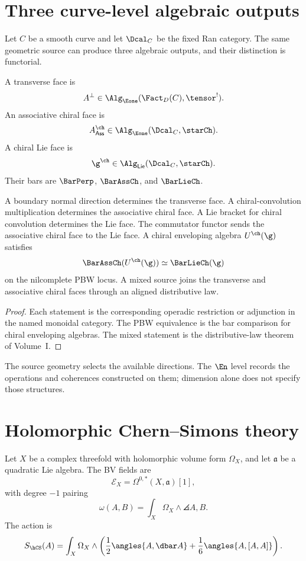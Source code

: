 \chapter{Three curve-level algebraic outputs}
Let $C$ be a smooth curve and let $\Dcal_C$ be the fixed Ran category.  The same geometric source can produce three algebraic outputs, and their distinction is functorial.

\begin{definition}
A transverse face is
\[
 A^\perp\in\Alg_{\Eone}(\Fact_D(C),\tensor^!).
\]
An associative chiral face is
\[
 A^{\ch}_{\mathsf{Ass}}\in\Alg_{\Eone}(\Dcal_C,\starCh).
\]
A chiral Lie face is
\[
 \g^{\ch}\in\Alg_{\mathsf{Lie}}(\Dcal_C,\starCh).
\]
Their bars are $\BarPerp$, $\BarAssCh$, and $\BarLieCh$.
\end{definition}

\begin{theorem}
A boundary normal direction determines the transverse face.  A chiral-convolution multiplication determines the associative chiral face.  A Lie bracket for chiral convolution determines the Lie face.  The commutator functor sends the associative chiral face to the Lie face.  A chiral enveloping algebra $U^{\ch}(\g)$ satisfies
\[
 \BarAssCh(U^{\ch}(\g))\simeq\BarLieCh(\g)
\]
on the nilcomplete PBW locus.  A mixed source joins the transverse and associative chiral faces through an aligned distributive law.
\end{theorem}
\begin{proof}
Each statement is the corresponding operadic restriction or adjunction in the named monoidal category.  The PBW equivalence is the bar comparison for chiral enveloping algebras.  The mixed statement is the distributive-law theorem of Volume~I.
\end{proof}

The source geometry selects the available directions.  The $\En$ level records the operations and coherences constructed on them; dimension alone does not specify those structures.

\chapter{Holomorphic Chern--Simons theory}
Let $X$ be a complex threefold with holomorphic volume form $\Omega_X$, and let $\mathfrak a$ be a quadratic Lie algebra. The BV fields are
\[
 \mathcal E_X=\Omega^{0,*}(X,\mathfrak a)[1],
\]
with degree $-1$ pairing
\[
 \omega(A,B)=\int_X\Omega_X\wedge\angles{A,B}.
\]
The action is
\[
 S_{\hCS}(A)=\int_X\Omega_X\wedge
 \left(\frac12\angles{A,\dbar A}+\frac16\angles{A,[A,A]}\right).
\]

